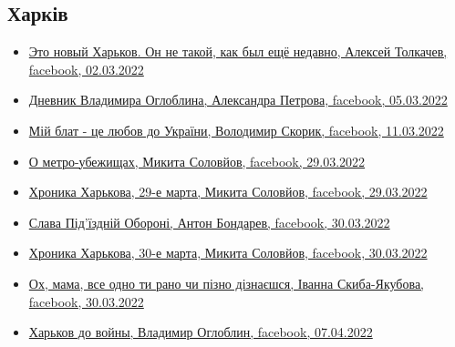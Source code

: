  
 
 
 
 
\subsection{Харків}
\label{sec:topics.vojna.harkov}

\begin{itemize} %
\item \hyperlink{02_03_2022.fb.tolkachev_aleksej.1.novyj_harkov}{
Это новый Харьков. Он не такой, как был ещё недавно, Алексей Толкачев, facebook, 02.03.2022%
}

\item \hyperlink{05_03_2022.fb.petrova_aleksandra.1.dnevnik_ogloblin}{%
Дневник Владимира Оглоблина, Александра Петрова, facebook, 05.03.2022%
}

\item \hyperlink{11_03_2022.fb.skoryk_volodymyr.harkiv.1.blat_lubov_do_ukrainy}{%
Мій блат - це любов до України, Володимир Скорик, facebook, 11.03.2022%
}

\item \hyperlink{29_03_2022.fb.solovjov_mikita.harkov.demsokyra.2.o_metro_ubezhischah}{%
О метро-убежищах, Микита Соловйов, facebook, 29.03.2022%
}

\item \hyperlink{29_03_2022.fb.solovjov_mikita.harkov.demsokyra.1.hronika}{%
Хроника Харькова, 29-е марта, Микита Соловйов, facebook, 29.03.2022%
}

\item \hyperlink{30_03_2022.fb.bondarev_anton.harkiv.1.slava_oboroni_podjezd}{%
Слава Під'їздній Обороні, Антон Бондарев, facebook, 30.03.2022%
}

\item \hyperlink{30_03_2022.fb.solovjov_mikita.harkov.demsokyra.1.hronika}{%
Хроника Харькова, 30-е марта, Микита Соловйов, facebook, 30.03.2022%
}

\item \hyperlink{30_03_2022.fb.skyba_jakubova_ivanna.harkiv.1.mama}{%
Ох, мама, все одно ти рано чи пізно дізнаєшся, Іванна Скиба-Якубова, facebook, 30.03.2022%
}

\item \hyperlink{07_04_2022.fb.ogloblin_vladimir.harkov.1.harkov_do_vojny}{%
Харьков до войны, Владимир Оглоблин, facebook, 07.04.2022%
}


\end{itemize}
